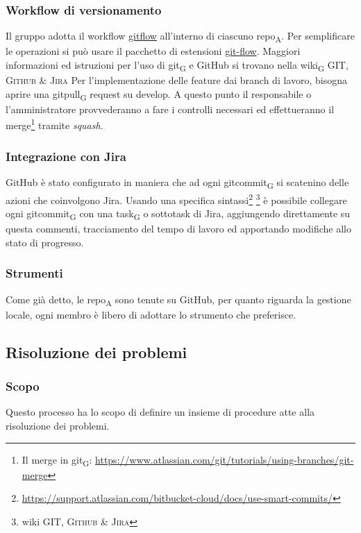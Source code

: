     \subsubsection{Workflow di versionamento}
        Il gruppo adotta il workflow \href{https://www.atlassian.com/git/tutorials/comparing-workflows/gitflow-workflow}{gitflow} all'interno di ciascuno repo\textsubscript{A}. Per semplificare le operazioni si può usare il pacchetto di estensioni \href{http://danielkummer.github.io/git-flow-cheatsheet/}{git-flow}. Maggiori informazioni ed istruzioni per l'uso di git\textsubscript{G} e GitHub si trovano nella wiki\textsubscript{G} \textsc{GIT, Github \& Jira}
            Per l'implementazione delle feature dai branch di lavoro, bisogna aprire una gitpull\textsubscript{G} request su develop. A questo punto il responsabile o l'amministratore provvederanno a fare i controlli necessari ed effettueranno il merge\footnote{Il merge in git\textsubscript{G}: \url{https://www.atlassian.com/git/tutorials/using-branches/git-merge}} tramite \textit{squash}.

    \subsubsection{Integrazione con Jira}
    \label{jiraintegration}
        GitHub è stato configurato in maniera che ad ogni gitcommit\textsubscript{G} si scatenino delle azioni che coinvolgono Jira. Usando una specifica sintassi\footnote{\url{https://support.atlassian.com/bitbucket-cloud/docs/use-smart-commits/}} \footnote{wiki \textsc{GIT, Github \& Jira}} è possibile collegare ogni gitcommit\textsubscript{G} con una task\textsubscript{G} o sottotask di Jira, aggiungendo direttamente su questa commenti, tracciamento del tempo di lavoro ed apportando modifiche allo stato di progresso.

    \subsubsection{Strumenti}
    Come già detto, le repo\textsubscript{A} sono tenute su GitHub, per quanto riguarda la gestione locale, ogni membro è libero di adottare lo strumento che preferisce.


\subsection{Risoluzione dei problemi}
    \label{risoluzioneproblemi}
    \subsubsection{Scopo}
        Questo processo ha lo scopo di definire un insieme di procedure atte alla risoluzione dei problemi.
